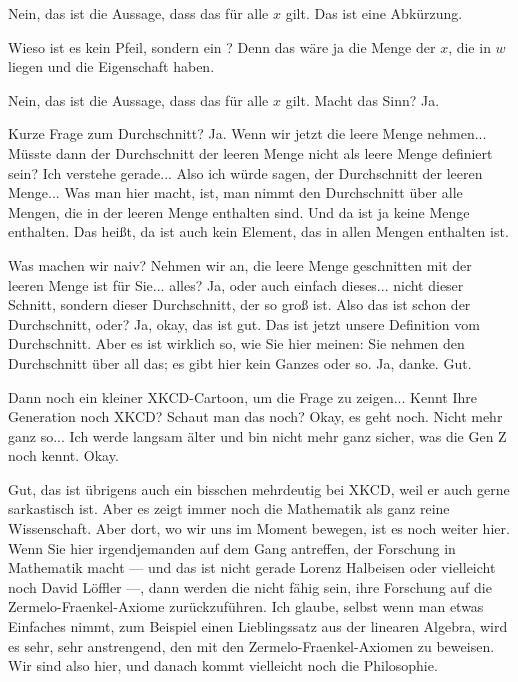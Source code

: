 \begin{spoken-clean}[continued]
Nein, das ist die Aussage, dass das für alle $x$ gilt. Das ist eine Abkürzung.
\end{spoken-clean}

\begin{student-interaction}[Studentenfrage]
Wieso ist es kein Pfeil, sondern ein ? Denn das wäre ja die Menge der $x$, die in $w$ liegen und die Eigenschaft haben.
\end{student-interaction}

\begin{spoken-clean}[continued]
Nein, das ist die Aussage, dass das für alle $x$ gilt. Macht das Sinn? Ja.
\end{spoken-clean}

\begin{spoken-clean}[00:39:35 - 00:40:53]
Kurze Frage zum Durchschnitt? Ja. Wenn wir jetzt die leere Menge nehmen... Müsste dann der Durchschnitt der leeren Menge nicht als leere Menge definiert sein? Ich verstehe gerade... Also ich würde sagen, der Durchschnitt der leeren Menge... Was man hier macht, ist, man nimmt den Durchschnitt über alle Mengen, die in der leeren Menge enthalten sind. Und da ist ja keine Menge enthalten. Das heißt, da ist auch kein Element, das in allen Mengen enthalten ist.

Was machen wir naiv? Nehmen wir an, die leere Menge geschnitten mit der leeren Menge ist für Sie... alles? Ja, oder auch einfach dieses... nicht dieser Schnitt, sondern dieser Durchschnitt, der so groß ist. Also das ist schon der Durchschnitt, oder? Ja, okay, das ist gut. Das ist jetzt unsere Definition vom Durchschnitt. Aber es ist wirklich so, wie Sie hier meinen: Sie nehmen den Durchschnitt über all das; es gibt hier kein Ganzes oder so. Ja, danke. Gut.
\end{spoken-clean}

\begin{spoken-clean}[00:40:53 - 00:41:07]
Dann noch ein kleiner XKCD-Cartoon, um die Frage zu zeigen... Kennt Ihre Generation noch XKCD? Schaut man das noch? Okay, es geht noch. Nicht mehr ganz so... Ich werde langsam älter und bin nicht mehr ganz sicher, was die Gen Z noch kennt. Okay.

Gut, das ist übrigens auch ein bisschen mehrdeutig bei XKCD, weil er auch gerne sarkastisch ist. Aber es zeigt immer noch die Mathematik als ganz reine Wissenschaft. Aber dort, wo wir uns im Moment bewegen, ist es noch weiter hier. Wenn Sie hier irgendjemanden auf dem Gang antreffen, der Forschung in Mathematik macht --- und das ist nicht gerade Lorenz Halbeisen oder vielleicht noch David Löffler ---, dann werden die nicht fähig sein, ihre Forschung auf die Zermelo-Fraenkel-Axiome zurückzuführen. Ich glaube, selbst wenn man etwas Einfaches nimmt, zum Beispiel einen Lieblingssatz aus der linearen Algebra, wird es sehr, sehr anstrengend, den mit den Zermelo-Fraenkel-Axiomen zu beweisen. Wir sind also hier, und danach kommt vielleicht noch die Philosophie.
\end{spoken-clean}

